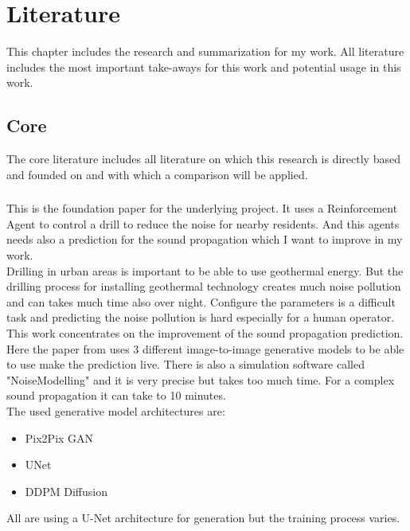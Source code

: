 \chapter{Literature}
\label{cha:literature}
	This chapter includes the research and summarization for my work. All literature includes the most important take-aways for this work and potential usage in this work. 


	\section{Core}
	\label{sec:lit-core}
		The core literature includes all literature on which this research is directly based and founded on and with which a comparison will be applied.
		
		\subsection{}
			This is the foundation paper for the underlying project. It uses a Reinforcement Agent to control a drill to reduce the noise for nearby residents. And this agents needs also a prediction for the sound propagation which I want to improve in my work.\\
			Drilling in urban areas is important to be able to use geothermal energy. But the drilling process for installing geothermal technology creates much noise pollution and can takes much time also over night. Configure the parameters is a difficult task and predicting the noise pollution is hard especially for a human operator.\\
			This work concentrates on the improvement of the sound propagation prediction. Here the paper from \citeauthor{ladwig_ai-guided_2024-1} uses 3 different image-to-image generative models to be able to use make the prediction live. There is also a simulation software called "NoiseModelling" and it is very precise but takes too much time. For a complex sound propagation it can take to 10 minutes.\\
			The used generative model architectures are:
			\begin{itemize}
			\item Pix2Pix GAN
			\item UNet
			\item DDPM Diffusion
			\end{itemize}
			All are using a U-Net architecture for generation but the training process varies.
			
			\newpage
			
